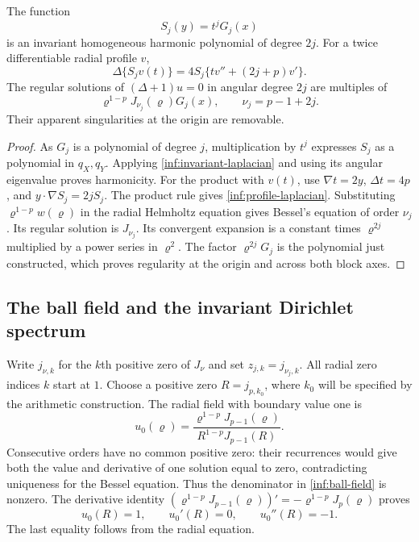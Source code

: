 \begin{lemma}\label{inf:solid-harmonics}
The function
\begin{equation}\label{inf:solid-definition}
 S_j(y)=t^jG_j(x)
\end{equation}
is an invariant homogeneous harmonic polynomial of degree $2j$.
For a twice differentiable radial profile $v$,
\begin{equation}\label{inf:profile-laplacian}
 \Delta\{S_jv(t)\}=4S_j\{tv''+(2j+p)v'\}.
\end{equation}
The regular solutions of $(\Delta+1)u=0$ in angular degree $2j$ are
multiples of
\begin{equation}\label{inf:regular-bessel-mode}
 \varrho^{1-p}J_{\nu_j}(\varrho)G_j(x),\qquad
 \nu_j=p-1+2j.
\end{equation}
Their apparent singularities at the origin are removable.
\end{lemma}
\begin{proof}
As $G_j$ is a polynomial of degree $j$, multiplication by $t^j$
expresses $S_j$ as a polynomial in $q_X,q_Y$. Applying
\eqref{inf:invariant-laplacian} and using its angular eigenvalue proves
harmonicity. For the product with $v(t)$, use
$\nabla t=2y$, $\Delta t=4p$, and $y\cdot\nabla S_j=2jS_j$.
The product rule gives \eqref{inf:profile-laplacian}.
Substituting $\varrho^{1-p}w(\varrho)$ in the radial Helmholtz equation
gives Bessel's equation of order $\nu_j$. Its regular solution is
$J_{\nu_j}$. Its convergent expansion is a constant times
$\varrho^{2j}$ multiplied by a power series in $\varrho^2$.
The factor $\varrho^{2j}G_j$ is the polynomial just constructed, which
proves regularity at the origin and across both block axes.
\end{proof}

\subsection{The ball field and the invariant Dirichlet spectrum}

Write $j_{\nu,k}$ for the $k$th positive zero of $J_\nu$ and set
$z_{j,k}=j_{\nu_j,k}$. All radial zero indices $k$ start at $1$.
Choose a positive zero $R=j_{p,k_0}$, where $k_0$ will be specified by
the arithmetic construction. The radial field with boundary value one is
\begin{equation}\label{inf:ball-field}
 u_0(\varrho)=
 \frac{\varrho^{1-p}J_{p-1}(\varrho)}{R^{1-p}J_{p-1}(R)}.
\end{equation}
Consecutive orders have no common positive zero: their recurrences
would give both the value and derivative of one solution equal to zero,
contradicting uniqueness for the Bessel equation. Thus the denominator
in \eqref{inf:ball-field} is nonzero.
The derivative identity
$(\varrho^{1-p}J_{p-1}(\varrho))'
=-\varrho^{1-p}J_p(\varrho)$ proves
\begin{equation}\label{inf:ball-traces}
 u_0(R)=1,\qquad u_0'(R)=0,\qquad u_0''(R)=-1.
\end{equation}
The last equality follows from the radial equation.


